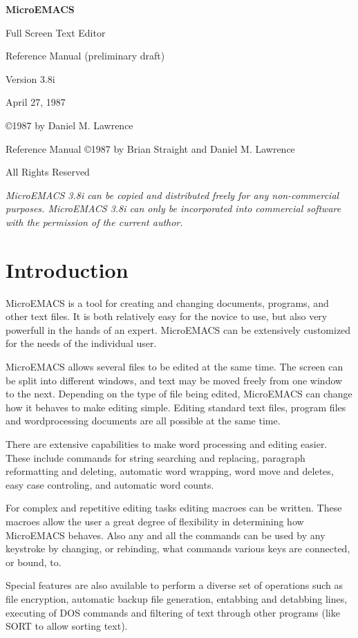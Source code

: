 \thispagestyle{empty}
\hbox{}
\vfill
\centerline{{\Large\bf{}MicroEMACS}}
\vspace{.25in}
\centerline{Full Screen Text Editor}
\centerline{Reference Manual (preliminary draft)}
\vspace{.5in}
\centerline{Version 3.8i}
\centerline{April 27, 1987}
\vspace{1in}
\centerline{\copyright 1987 by Daniel M. Lawrence}
\centerline{Reference Manual \copyright 1987 by Brian Straight and
Daniel M. Lawrence}
\centerline{All Rights Reserved}
\vspace{.5in}
{\it{}MicroEMACS 3.8i can be copied and distributed freely
for any non-commercial purposes. MicroEMACS 3.8i can
only be incorporated into commercial software with
the permission of the current author.}
\vfill
\newpage
{}
\setcounter{page}{1}
\tableofcontents
\cleardoublepage
\chapter*{Introduction}

MicroEMACS is a tool for creating and changing documents,
programs, and other text files.  It is both relatively easy for the
novice to use, but also very powerfull in the hands of an expert.
MicroEMACS can be extensively customized for the needs of the
individual user.

MicroEMACS allows several files to be edited at the same time.
The screen can be split into different windows, and text may be moved
freely from one window to the next.  Depending on the type of file being
edited, MicroEMACS can change how it behaves to make editing simple.
Editing standard text files, program files and wordprocessing documents
are all possible at the same time.

There are extensive capabilities to make word processing and
editing easier.  These include commands for string searching and
replacing, paragraph reformatting and deleting, automatic word wrapping,
word move and deletes, easy case controling, and automatic word counts.

For complex and repetitive editing tasks editing macroes can be
written.  These macroes allow the user a great degree of flexibility in
determining how MicroEMACS behaves.  Also any and all the commands can
be used by any keystroke by changing, or rebinding, what commands
various keys are connected, or bound, to.

Special features are also available to perform a diverse set of
operations such as file encryption, automatic backup file generation,
entabbing and detabbing lines, executing of DOS commands and filtering
of text through other programs (like SORT to allow sorting text).

